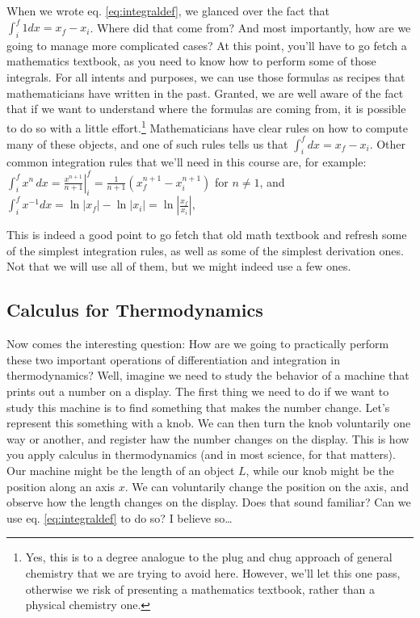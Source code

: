 \documentclass[
  9pt,
]{extbook}
\theoremstyle{definition}
\theoremstyle{definition}
\theoremstyle{definition}
\theoremstyle{definition}
\theoremstyle{remark}
\begin{document}
When we wrote eq. \eqref{eq:integraldef}, we glanced over the fact that \(\int_{i}^{f} 1 dx = x_f-x_i\). Where did that come from? And most importantly, how are we going to manage more complicated cases? At this point, you'll have to go fetch a mathematics textbook, as you need to know how to perform some of those integrals. For all intents and purposes, we can use those formulas as recipes that mathematicians have written in the past. Granted, we are well aware of the fact that if we want to understand where the formulas are coming from, it is possible to do so with a little effort.\footnote{Yes, this is to a degree analogue to the plug and chug approach of general chemistry that we are trying to avoid here. However, we'll let this one pass, otherwise we risk of presenting a mathematics textbook, rather than a physical chemistry one.} Mathematicians have clear rules on how to compute many of these objects, and one of such rules tells us that \(\int_{i}^{f} dx = x_f-x_i\). Other common integration rules that we'll need in this course are, for example: \(\int_{i}^{f} x^{n}\,dx=\left.\frac{x^{n+1}}{n+1}\right| _i^f  =\frac{1}{n+1}\left(x_f^{n+1}-x_i^{n+1}\right)\) for \(n\neq 1\), and \(\int_{i}^{f} x^{-1} dx=\ln \left|x_f\right|-\ln \left|x_i\right|=\ln \left|\frac{x_f}{x_i}\right|,\)

This is indeed a good point to go fetch that old math textbook and refresh some of the simplest integration rules, as well as some of the simplest derivation ones. Not that we will use all of them, but we might indeed use a few ones.

\subsection{Calculus for Thermodynamics}\label{calculus-for-thermodynamics}

Now comes the interesting question: How are we going to practically perform these two important operations of differentiation and integration in thermodynamics? Well, imagine we need to study the behavior of a machine that prints out a number on a display. The first thing we need to do if we want to study this machine is to find something that makes the number change. Let's represent this something with a knob. We can then turn the knob voluntarily one way or another, and register haw the number changes on the display. This is how you apply calculus in thermodynamics (and in most science, for that matters). Our machine might be the length of an object \(L\), while our knob might be the position along an axis \(x\). We can voluntarily change the position on the axis, and observe how the length changes on the display. Does that sound familiar? Can we use eq. \eqref{eq:integraldef} to do so? I believe so\ldots{}
\end{document}
